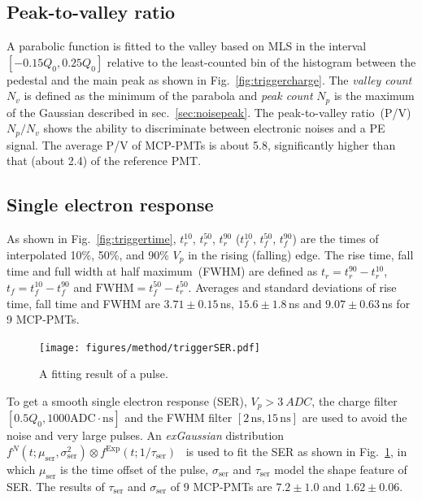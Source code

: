 \subsection{Peak-to-valley ratio}
A parabolic function is fitted to the valley based on MLS in the interval $[-0.15Q_0, 0.25Q_0]$ relative to the least-counted bin of the histogram between the pedestal and the main peak as shown in Fig.~\ref{fig:triggercharge}. The \emph{valley count} $N_v$ is defined as the minimum of the parabola and \emph{peak count} $N_p$ is the maximum of the Gaussian described in sec.~\ref{sec:noisepeak}. The peak-to-valley ratio~(P/V) ${N_p}/{N_v}$ shows the ability to discriminate between electronic noises and a PE signal. The average P/V of MCP-PMTs is about 5.8, significantly higher than that (about 2.4) of the reference PMT.

\subsection{Single electron response}
As shown in Fig.~\ref{fig:triggertime}, $t^{10}_r$, $t^{50}_r$, $t^{90}_r$ ($t^{10}_f$, $t^{50}_f$, $t^{90}_f$) are the times of interpolated 10\%, 50\%, and 90\% $V_p$ in the rising (falling) edge. The rise time, fall time and full width at half maximum~(FWHM) are defined as $t_r = t^{90}_r - t^{10}_r$, $t_f = t^{10}_f - t^{90}_f$ and $\mathrm{FWHM} = t^{50}_f - t^{50}_r$. Averages and standard deviations of rise time, fall time and FWHM are $3.71\pm0.15$\,ns, $15.6\pm1.8$\,ns and $9.07\pm0.63$\,ns for 9 MCP-PMTs.

\begin{figure}
    \centering
        \texttt{[image: figures/method/triggerSER.pdf]}
        \caption{A fitting result of a pulse.}%
        \label{fig:triggerser}
\end{figure}
To get a smooth single electron response (SER), $V_p>\SI{3}{ADC}$, the charge filter $[0.5Q_0, 1000\mathrm{ADC\cdot ns}]$ and the FWHM filter $[2\,\mathrm{ns}, 15\,\mathrm{ns}]$ are used to avoid the noise and very large pulses. An \emph{exGaussian} distribution $f^N(t;\mu_{\mathrm{ser}},\sigma_\mathrm{ser}^2)\otimes f^{\mathrm{Exp}}(t;1/\tau_\mathrm{ser})$~\cite{Luo:2022xrd} is used to fit the SER as shown in Fig.~\ref{fig:triggerser}, in which $\mu_{\mathrm{ser}}$ is the time offset of the pulse, $\sigma_{\mathrm{ser}}$ and $\tau_{\mathrm{ser}}$ model the shape feature of SER. The results of $\tau_{\mathrm{ser}}$ and $\sigma_{\mathrm{ser}}$ of 9 MCP-PMTs are $7.2\pm1.0$ and $1.62\pm0.06$.

